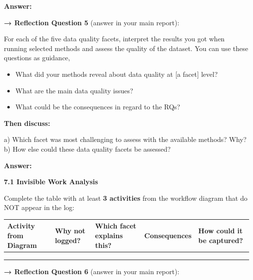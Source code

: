 \textbf{Answer:}

\textbf{→ Reflection Question 5} (answer in your main report):

For each of the five data quality facets, interpret the results you got when running selected methods and assess the quality of the dataset. You can use these questions as guidance,
\begin{itemize}
  \item What did your methods reveal about data quality at [a facet] level?
  \item What are the main data quality issues?
  \item What could be the consequences in regard to the RQs?
\end{itemize}

\textbf{Then discuss:}

a) Which facet was most challenging to assess with the available methods? Why?\\
b) How else could these data quality facets be assessed?

\textbf{Answer:}

\textbf{7.1 Invisible Work Analysis}

Complete the table with at least \textbf{3 activities} from the workflow diagram that do NOT appear in the log:

\begin{table}[H]
\centering
\small
\label{tab:d7_invisible_work}
\begin{tabularx}{\textwidth}{
>{\raggedright\arraybackslash}p{}
>{\raggedright\arraybackslash}p{}
>{\raggedright\arraybackslash}p{}
>{\raggedright\arraybackslash}p{}
>{\raggedright\arraybackslash}X
}
\toprule
Activity from Diagram & Why not logged? & Which facet explains this? & Consequences & How could it be captured? \\
\midrule
 &  &  &  &  \\
 &  &  &  &  \\
 &  &  &  &  \\
\bottomrule
\end{tabularx}
\end{table}

\textbf{→ Reflection Question 6} (answer in your main report):

